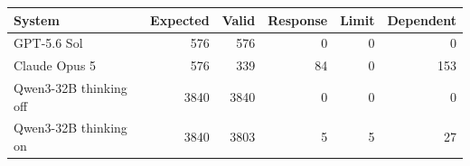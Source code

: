 \begin{tabular}{lrrrrr}
\toprule
System & Expected & Valid & Response & Limit & Dependent \\
\midrule
GPT-5.6 Sol & 576 & 576 & 0 & 0 & 0 \\
Claude Opus 5 & 576 & 339 & 84 & 0 & 153 \\
Qwen3-32B thinking off & 3840 & 3840 & 0 & 0 & 0 \\
Qwen3-32B thinking on & 3840 & 3803 & 5 & 5 & 27 \\
\bottomrule
\end{tabular}
